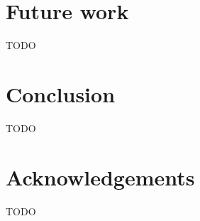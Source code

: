 \documentclass[12pt,a4paper,final]{article}
\begin{document}
\section{Future work} \label{section:Future_work}

TODO


\section{Conclusion} \label{section:Conclusion}

TODO


\section*{Acknowledgements}

TODO




\end{document}

